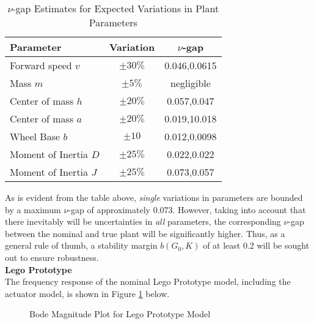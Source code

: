 \begin{table}[H]
	\centering
 	\begin{tabular}[t]{lcc} 
 	\toprule
 	Parameter & Variation & $\nu$-gap\\ 
 	\midrule
 	Forward speed $v$ & $\pm 30\%$ & 0.046,0.0615  \\
 	Mass $m$ & $\pm 5\%$ & negligible \\ 
 	Center of mass $h$ & $\pm 20\%$ & 0.057,0.047 \\
 	Center of mass $a$ & $\pm 20\%$ & 0.019,10.018\\
 	Wheel Base $b$ & $\pm 10$ & 0.012,0.0098\\
 	Moment of Inertia $D$ & $\pm 25\%$ & 0.022,0.022\\
 	Moment of Inertia $J$ & $\pm 25\%$ & 0.073,0.057\\
 	\bottomrule
	\end{tabular}
 	\caption{$\nu$-gap Estimates for Expected Variations in Plant Parameters}
 	\label{table:nugap}
\end{table}

As is evident from the table above, \textit{single} variations in parameters are bounded by a maximum $\nu$-gap of approximately 0.073. However, taking into account that there inevitably  will be uncertainties in \textit{all} parameters, the corresponding $\nu$-gap between the nominal and true plant will be significantly higher. Thus, as a general rule of thumb, a stability margin $b(G_0,K)$ of at least 0.2 will be sought out to ensure robustness. \\

\textbf{Lego Prototype} \\
The frequency response of the nominal Lego Prototype model, including the actuator model, is shown in Figure \ref{fig:bodeLego} below.

\begin{figure}[H]
	\centering
	\caption{Bode Magnitude Plot for Lego Prototype Model}
	\label{fig:bodeLego}
\end{figure}

